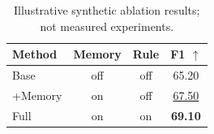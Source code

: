 \documentclass[10pt]{article}
\begin{document}
\begin{table}[t]
\centering
\caption{Illustrative synthetic ablation results; not measured experiments.}
\label{tab:ablation}
\begin{tabular}{@{}lccc@{}}
\toprule
Method & Memory & Rule & F1 $\uparrow$ \\
\midrule
Base & off & off & 65.20 \\
+Memory & on & off & \underline{67.50} \\
Full & on & on & \textbf{69.10} \\
\bottomrule
\end{tabular}
\end{table}
\end{document}

